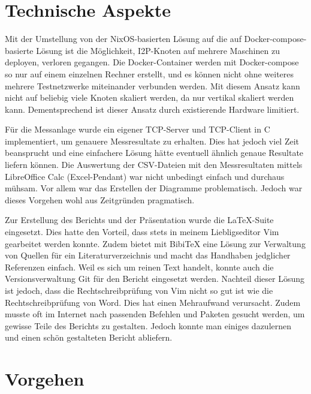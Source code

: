 \section{Technische Aspekte}\label{sec:technische_aspekte}

Mit der Umstellung von der NixOS-basierten Lösung auf die auf Docker-compose-basierte Lösung ist
die Möglichkeit, I2P-Knoten auf mehrere Maschinen zu deployen, verloren gegangen.
Die Docker-Container werden mit Docker-compose so nur auf einem einzelnen Rechner erstellt, und
es können nicht ohne weiteres mehrere Testnetzwerke miteinander verbunden werden.
Mit diesem Ansatz kann nicht auf beliebig viele Knoten skaliert werden, da nur vertikal skaliert werden kann.
Dementsprechend ist dieser Ansatz durch existierende Hardware limitiert.

Für die Messanlage wurde ein eigener TCP-Server und TCP-Client in C implementiert, um genauere Messresultate zu erhalten.
Dies hat jedoch viel Zeit beansprucht und eine einfachere Lösung hätte
eventuell ähnlich genaue Resultate liefern können.
Die Auswertung der CSV-Dateien mit den Messresultaten mittels LibreOffice Calc (Excel-Pendant) war nicht unbedingt einfach und durchaus mühsam.
Vor allem war das Erstellen der Diagramme problematisch. Jedoch war dieses Vorgehen wohl aus Zeitgründen pragmatisch.

Zur Erstellung des Berichts und der Präsentation wurde die \LaTeX-Suite eingesetzt.
Dies hatte den Vorteil, dass stets in meinem Liebligseditor Vim gearbeitet werden konnte.
Zudem bietet \LaTe  mit BibiTeX eine Lösung zur Verwaltung von Quellen für ein Literaturverzeichnis und macht das Handhaben jedglicher Referenzen einfach. Weil es sich um reinen Text handelt, konnte auch die Versionsverwaltung Git für den Bericht eingesetzt werden.
Nachteil dieser Lösung ist jedoch, dass die Rechtschreibprüfung von Vim nicht so gut ist wie die Rechtschreibprüfung von Word.
Dies hat einen Mehraufwand verursacht.
Zudem musste oft im Internet nach passenden Befehlen und Paketen gesucht werden, um gewisse Teile des Berichts zu gestalten.
Jedoch konnte man einiges dazulernen und einen schön gestalteten Bericht abliefern.

\clearpage

\section{Vorgehen}\label{sec:eval_vorgehen}

